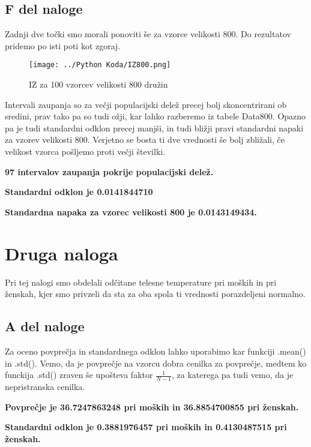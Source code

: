 \documentclass{article}
\begin{document}
    \subsection{F del naloge}
    Zadnji dve točki smo morali ponoviti še za vzorce velikosti 800. Do rezultatov pridemo po isti poti kot zgoraj.
    \begin{figure}[H]
        \begin{center}
            \texttt{[image: ../Python Koda/IZ800.png]}
            \caption{IZ za 100 vzorcev velikosti 800 družin}
            \label{800}
        \end{center} 
    \end{figure}
    Intervali zaupanja so za večji populacijski delež precej bolj skoncentrirani ob sredini, prav tako pa so tudi ožji, kar lahko razberemo iz tabele Data800. Opazno pa je
    tudi standardni odklon precej manjši, in tudi bližji pravi standardni napaki za vzorev velikosti 800. Verjetno se bosta ti dve vrednosti še bolj zbližali, če velikost vzorca
    pošljemo proti večji številki.
    \par \textbf{97 intervalov zaupanja pokrije populacijski delež.}
    \par \textbf{Standardni odklon je 0.0141844710}
    \par \textbf{Standardna napaka za vzorec velikosti 800 je 0.0143149434.}


    \section{Druga naloga}
    Pri tej nalogi smo obdelali odčitane telesne temperature pri moških in pri ženskah, kjer smo privzeli da sta za oba spola ti vrednosti porazdeljeni normalno.

    \subsection{A del naloge}
    Za oceno povprečja in standardnega odklon lahko uporabimo kar funkciji .mean() in .std(). Vemo, da je povprečje na vzorcu dobra cenilka za povprečje, medtem ko funckija
    .std() zraven še upošteva faktor $\frac{1}{N - 1}$, za katerega pa tudi vemo, da je nepristranska cenilka.
    \par \textbf{Povprečje je 36.7247863248 pri moških in 36.8854700855 pri ženskah.}
    \par \textbf{Standardni odklon je 0.3881976457 pri moških in 0.4130487515 pri ženskah.}
\end{document}
